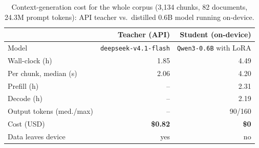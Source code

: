 \begin{table}[t]
\centering
\small
\caption{Context-generation cost for the whole corpus (3{,}134 chunks, 82 documents, 24.3M prompt tokens): API teacher vs.\ distilled 0.6B model running on-device.}
\label{tab:ingest}
\begin{tabular}{lrr}
\toprule
 & Teacher (API) & Student (on-device) \\
\midrule
Model & \texttt{deepseek-v4.1-flash} & \texttt{Qwen3-0.6B} with LoRA \\
Wall-clock (h) & 1.85 & 4.49 \\
Per chunk, median (s) & 2.06 & 4.20 \\
Prefill (h) & -- & 2.31 \\
Decode (h) & -- & 2.19 \\
Output tokens (med./max) & -- & 90/160 \\
Cost (USD) & \textbf{\$0.82} & \textbf{\$0} \\
Data leaves device & yes & no \\
\bottomrule
\end{tabular}
\end{table}

